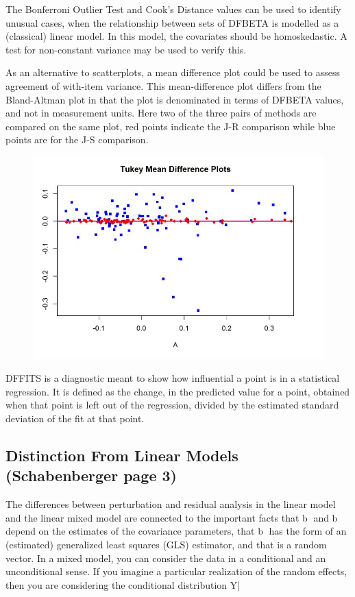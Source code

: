 \documentclass[12pt, a4paper]{report}
\theoremstyle{plain}
\theoremstyle{definition}
\theoremstyle{remark}
\begin{document}
	
	
	The Bonferroni Outlier Test and Cook's Distance values can be used to identify unusual cases, when the relationship between sets of DFBETA is modelled as a (classical) linear model. In this model, the covariates should be homoskedastic. A test for non-constant variance may be used to verify this. 
	
	
	As an alternative to scatterplots, a mean difference plot could be used to assess agreement of with-item variance. This mean-difference plot differs from the Bland-Altman plot in that the plot is denominated in terms of DFBETA values, and not in measurement units. Here two of the three pairs of methods are compared on the same plot, red points indicate the J-R comparison while blue points are for the J-S comparison.
	
	\begin{figure}[h!
		]
		\centering
		\includegraphics[width=0.7\linewidth]{images/04-TMDplot}
		
	\end{figure}
DFFITS is a diagnostic meant to show how influential a point is in a statistical regression. It is defined as the change, in the predicted value for a point, obtained when that point is left out of the regression, divided by the estimated standard deviation of the fit at that point.
\newpage	


\subsection{Distinction From Linear Models (Schabenberger page 3)}
The differences between perturbation and residual analysis in the linear model and the linear mixed model
are connected to the important facts that b and b
depend on the estimates of the covariance parameters,
that b has the form of an (estimated) generalized least squares (GLS) estimator, and that 
is a random
vector.
In a mixed model, you can consider the data in a conditional and an unconditional sense. If you imagine
a particular realization of the random effects, then you are considering the conditional distribution
Y|
\end{document}
